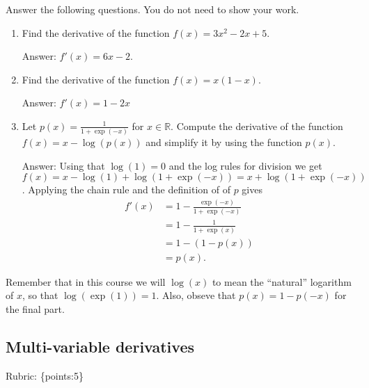 \documentclass{article}
\def\ans#1{\par\gre{Answer: #1}}
\def\rubric#1{\gre{Rubric: \{#1\}}}{}
\def\blu#1{{\color{blu}#1}}
\def\gre#1{{\color{gre}#1}}
\def\R{\mathbb{R}}
\newcommand{\alignStar}[1]{\begin{align*}#1\end{align*}}
\begin{document}
	\blu{Answer the following questions.} You do not need to show your work.
	
	\begin{enumerate}
		\item Find the derivative of the function $f(x) = 3x^2 -2x + 5$.
		\ans{$f'(x) = 6x - 2$.}
		\item Find the derivative of the function $f(x) = x(1-x)$.
		\ans{$f'(x) = 1 - 2x$}
		\item Let $p(x) = \frac{1}{1+\exp(-x)}$ for $x \in \R$. Compute the derivative of the function $f(x) = x-\log(p(x))$ and simplify it by using the function $p(x)$.
		\ans{Using that $\log(1) = 0$ and the log rules for division we get $f(x) = x -\log(1)+\log(1+\exp(-x)) = x + \log(1+\exp(-x))$. Applying the chain rule and the definition of of $p$ gives
			\alignStar{
				f'(x) & = 1-\frac{\exp(-x)}{1+\exp(-x)}\\
				& = 1-\frac{1}{1+\exp(x)}\\
				& = 1-(1-p(x))\\
				& = p(x).
			}
		}
	\end{enumerate}
	Remember that in this course we will $\log(x)$ to mean the ``natural'' logarithm of $x$, so that $\log(\exp(1)) = 1$. Also, obseve that $p(x) = 1-p(-x)$ for the final part.
	
	\subsection{Multi-variable derivatives}
	\label{sub.multi.var}
	\rubric{points:5}
	
\end{document}

